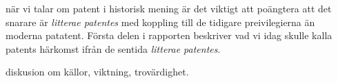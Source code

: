 när vi talar om patent i historisk mening är det viktigt att poängtera att det snarare är \emph{litterae patentes} med koppling till de tidigare preivilegierna än moderna patatent. Första delen i rapporten beskriver vad vi idag skulle kalla patents härkomst ifrån de sentida \emph{litterae patentes}.

diskusion om källor, viktning, trovärdighet.

